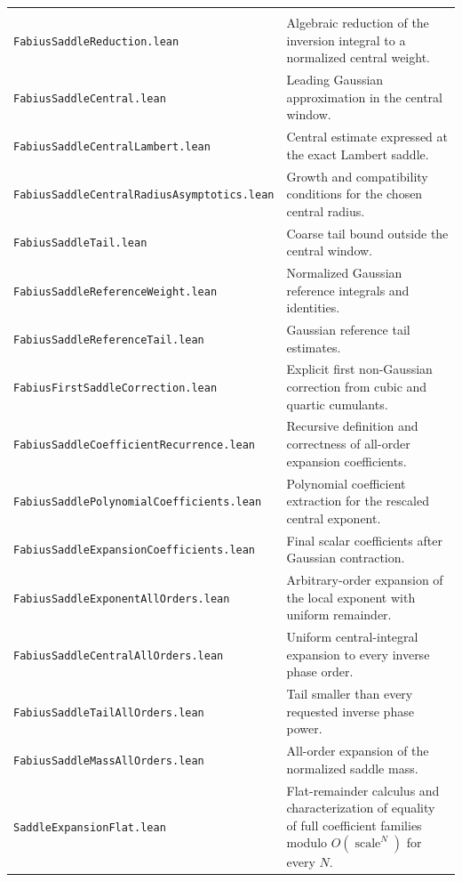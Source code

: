 \documentclass[11pt,oneside]{article}
\theoremstyle{definition}
\theoremstyle{remark}
\begin{document}
\begin{longtable}{>{\raggedright\arraybackslash}p{} >{\raggedright\arraybackslash}p{}}
\addlinespace[0.45em]
\multicolumn{2}{l}{\textbf{Central integral and all-order machinery}}\\[0.25em]
\nolinkurl{FabiusSaddleReduction.lean} & Algebraic reduction of the inversion integral to a normalized central weight. \\
\nolinkurl{FabiusSaddleCentral.lean} & Leading Gaussian approximation in the central window. \\
\nolinkurl{FabiusSaddleCentralLambert.lean} & Central estimate expressed at the exact Lambert saddle. \\
\nolinkurl{FabiusSaddleCentralRadiusAsymptotics.lean} & Growth and compatibility conditions for the chosen central radius. \\
\nolinkurl{FabiusSaddleTail.lean} & Coarse tail bound outside the central window. \\
\nolinkurl{FabiusSaddleReferenceWeight.lean} & Normalized Gaussian reference integrals and identities. \\
\nolinkurl{FabiusSaddleReferenceTail.lean} & Gaussian reference tail estimates. \\
\nolinkurl{FabiusFirstSaddleCorrection.lean} & Explicit first non-Gaussian correction from cubic and quartic cumulants. \\
\nolinkurl{FabiusSaddleCoefficientRecurrence.lean} & Recursive definition and correctness of all-order expansion coefficients. \\
\nolinkurl{FabiusSaddlePolynomialCoefficients.lean} & Polynomial coefficient extraction for the rescaled central exponent. \\
\nolinkurl{FabiusSaddleExpansionCoefficients.lean} & Final scalar coefficients after Gaussian contraction. \\
\nolinkurl{FabiusSaddleExponentAllOrders.lean} & Arbitrary-order expansion of the local exponent with uniform remainder. \\
\nolinkurl{FabiusSaddleCentralAllOrders.lean} & Uniform central-integral expansion to every inverse phase order. \\
\nolinkurl{FabiusSaddleTailAllOrders.lean} & Tail smaller than every requested inverse phase power. \\
\nolinkurl{FabiusSaddleMassAllOrders.lean} & All-order expansion of the normalized saddle mass. \\
\nolinkurl{SaddleExpansionFlat.lean} & Flat-remainder calculus and characterization of equality of full coefficient families modulo \(O(\operatorname{scale}^N)\) for every \(N\). \\

\end{longtable}
\end{document}
